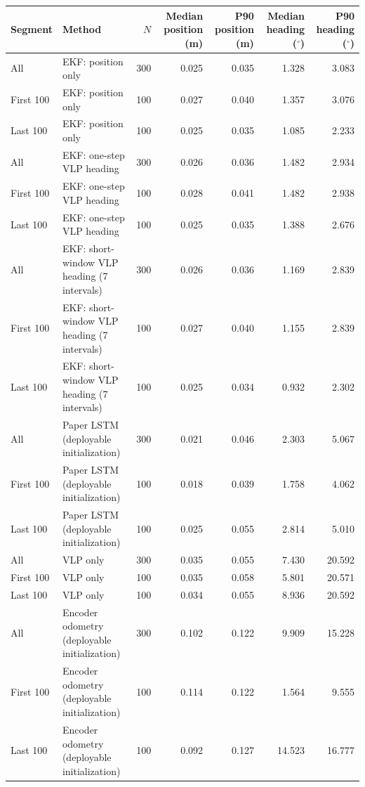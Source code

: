 \begin{tabular}{llrrrrr}
\toprule
Segment & Method & $N$ & Median position (m) & P90 position (m) & Median heading ($^\circ$) & P90 heading ($^\circ$) \\
\midrule
All & EKF: position only & 300 & 0.025 & 0.035 & 1.328 & 3.083 \\
First 100 & EKF: position only & 100 & 0.027 & 0.040 & 1.357 & 3.076 \\
Last 100 & EKF: position only & 100 & 0.025 & 0.035 & 1.085 & 2.233 \\
All & EKF: one-step VLP heading & 300 & 0.026 & 0.036 & 1.482 & 2.934 \\
First 100 & EKF: one-step VLP heading & 100 & 0.028 & 0.041 & 1.482 & 2.938 \\
Last 100 & EKF: one-step VLP heading & 100 & 0.025 & 0.035 & 1.388 & 2.676 \\
All & EKF: short-window VLP heading (7 intervals) & 300 & 0.026 & 0.036 & 1.169 & 2.839 \\
First 100 & EKF: short-window VLP heading (7 intervals) & 100 & 0.027 & 0.040 & 1.155 & 2.839 \\
Last 100 & EKF: short-window VLP heading (7 intervals) & 100 & 0.025 & 0.034 & 0.932 & 2.302 \\
All & Paper LSTM (deployable initialization) & 300 & 0.021 & 0.046 & 2.303 & 5.067 \\
First 100 & Paper LSTM (deployable initialization) & 100 & 0.018 & 0.039 & 1.758 & 4.062 \\
Last 100 & Paper LSTM (deployable initialization) & 100 & 0.025 & 0.055 & 2.814 & 5.010 \\
All & VLP only & 300 & 0.035 & 0.055 & 7.430 & 20.592 \\
First 100 & VLP only & 100 & 0.035 & 0.058 & 5.801 & 20.571 \\
Last 100 & VLP only & 100 & 0.034 & 0.055 & 8.936 & 20.592 \\
All & Encoder odometry (deployable initialization) & 300 & 0.102 & 0.122 & 9.909 & 15.228 \\
First 100 & Encoder odometry (deployable initialization) & 100 & 0.114 & 0.122 & 1.564 & 9.555 \\
Last 100 & Encoder odometry (deployable initialization) & 100 & 0.092 & 0.127 & 14.523 & 16.777 \\
\bottomrule
\end{tabular}

